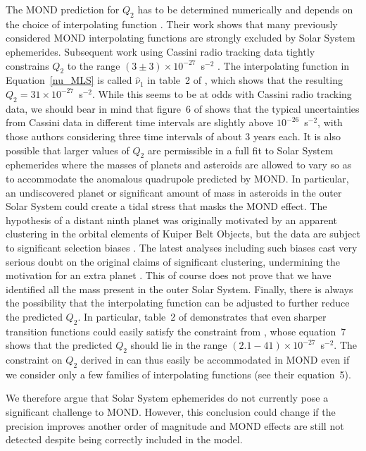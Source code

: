 \documentclass[fleqn,usenatbib,useAMS]{mnras} %
\begin{document}
The MOND prediction for $Q_2$ has to be determined numerically and depends on the choice of interpolating function \citep{Blanchet_2011}. Their work shows that many previously considered MOND interpolating functions are strongly excluded by Solar System ephemerides. Subsequent work using Cassini radio tracking data \citep{Matson_1992} tightly constrains $Q_2$ to the range $\left(3 \pm 3\right) \times 10^{-27}$~s$^{-2}$ \citep{Hees_2014}. The interpolating function in Equation~\ref{nu_MLS} is called $\hat{\nu}_1$ in table~2 of \citet{Hees_2016}, which shows that the resulting $Q_2 = 31 \times 10^{-27}$~s$^{-2}$. While this seems to be at odds with Cassini radio tracking data, we should bear in mind that figure~6 of \citet{Hees_2014} shows that the typical uncertainties from Cassini data in different time intervals are slightly above $10^{-26}$~s$^{-2}$, with those authors considering three time intervals of about 3 years each. It is also possible that larger values of $Q_2$ are permissible in a full fit to Solar System ephemerides where the masses of planets and asteroids are allowed to vary so as to accommodate the anomalous quadrupole predicted by MOND. In particular, an undiscovered planet \citep{Batygin_2016} or significant amount of mass in asteroids in the outer Solar System could create a tidal stress that masks the MOND effect. The hypothesis of a distant ninth planet was originally motivated by an apparent clustering in the orbital elements of Kuiper Belt Objects, but the data are subject to significant selection biases \citep{Shankman_2017}. The latest analyses including such biases cast very serious doubt on the original claims of significant clustering, undermining the motivation for an extra planet \citep{Bernardinelli_2020, Napier_2021}. This of course does not prove that we have identified all the mass present in the outer Solar System. Finally, there is always the possibility that the interpolating function can be adjusted to further reduce the predicted $Q_2$. In particular, table~2 of \citet{Hees_2016} demonstrates that even sharper transition functions could easily satisfy the constraint from \citet{Hees_2014}, whose equation~7 shows that the predicted $Q_2$ should lie in the range $\left(2.1-41\right) \times 10^{-27}$~s$^{-2}$. The constraint on $Q_2$ derived in \citet{Hees_2014} can thus easily be accommodated in MOND even if we consider only a few families of interpolating functions (see their equation~5).

We therefore argue that Solar System ephemerides do not currently pose a significant challenge to MOND. However, this conclusion could change if the precision improves another order of magnitude and MOND effects are still not detected despite being correctly included in the model.
\end{document}
